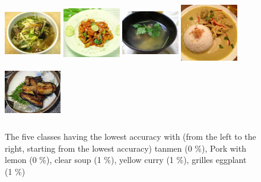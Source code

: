 
\begin{figure}
    \centering
    \includegraphics[height=2.5cm, width=2.5cm]{img/least_tanmen.jpg}
    \includegraphics[height=2.5cm, width=2.5cm]{img/least_pork_with_lemon.jpg}
    \includegraphics[height=2.5cm, width=2.5cm]{img/least_clear_soup.jpg}
    \includegraphics[height=2.5cm, width=2.5cm]{img/least_yellow_curry.jpg}
    \includegraphics[height=2.5cm, width=2.5cm]{img/least_grilled_eggplant.jpg}
    \caption[Classes having the lowest accuracy]{The five classes having the lowest accuracy with (from the left to the right, starting from the lowest accuracy) tanmen (0 \%), Pork with lemon (0 \%), clear soup (1 \%), yellow curry (1 \%), grilles eggplant (1 \%)}
    \label{fig:least_5}
\end{figure}



